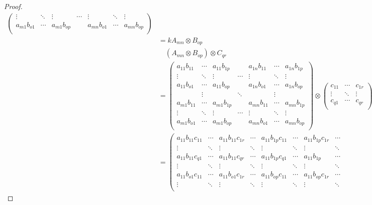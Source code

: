 \documentclass[dvipdfmx]{jsarticle}
\begin{document}
\begin{proof}
\begin{align*}
\begin{pmatrix}
 \vdots & \ddots & \vdots & \cdots & \vdots & \ddots & \vdots \\
a_{m1}b_{o1} & \cdots & a_{m1}b_{op} & \  & a_{mn}b_{o1} & \cdots & a_{mn}b_{op} \\
\end{pmatrix}\\
&= kA_{mn} \otimes B_{op}\\
&\quad \left( A_{mn} \otimes B_{op} \right) \otimes C_{qr}\\
&= \begin{pmatrix}
a_{11}b_{11} & \cdots & a_{11}b_{1p} & \  & a_{1n}b_{11} & \cdots & a_{1n}b_{1p} \\
 \vdots & \ddots & \vdots & \cdots & \vdots & \ddots & \vdots \\
a_{11}b_{o1} & \cdots & a_{11}b_{op} & \  & a_{1n}b_{o1} & \cdots & a_{1n}b_{op} \\
\  & \vdots & \  & \ddots & \  & \vdots & \  \\
a_{m1}b_{11} & \cdots & a_{m1}b_{1p} & \  & a_{mn}b_{11} & \cdots & a_{mn}b_{1p} \\
 \vdots & \ddots & \vdots & \cdots & \vdots & \ddots & \vdots \\
a_{m1}b_{o1} & \cdots & a_{m1}b_{op} & \  & a_{mn}b_{o1} & \cdots & a_{mn}b_{op} \\
\end{pmatrix} \otimes \begin{pmatrix}
c_{11} & \cdots & c_{1r} \\
 \vdots & \ddots & \vdots \\
c_{q1} & \cdots & c_{qr} \\
\end{pmatrix}\\
&= \left( \begin{matrix}
a_{11}b_{11}c_{11} & \cdots & a_{11}b_{11}c_{1r} & \cdots & a_{11}b_{1p}c_{11} & \cdots & a_{11}b_{1p}c_{1r} & \cdots \\
 \vdots & \ddots & \vdots & \ddots & \vdots & \ddots & \vdots & \ddots \\
a_{11}b_{11}c_{q1} & \cdots & a_{11}b_{11}c_{qr} & \cdots & a_{11}b_{1p}c_{q1} & \cdots & a_{11}b_{1p} & \cdots \\
 \vdots & \ddots & \vdots & \ddots & \vdots & \ddots & \vdots & \ddots \\
a_{11}b_{o1}c_{11} & \cdots & a_{11}b_{o1}c_{1r} & \cdots & a_{11}b_{op}c_{11} & \cdots & a_{11}b_{op}c_{1r} & \cdots \\
 \vdots & \ddots & \vdots & \ddots & \vdots & \ddots & \vdots & \ddots \\

\end{matrix}
\end{align*}
\end{proof}
\end{document}
